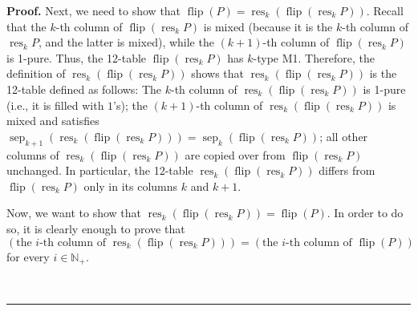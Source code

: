 \documentclass[numbers=enddot,12pt,final,onecolumn,notitlepage]{scrartcl}%
\theoremstyle{definition}
\newenvironment{proof}[1][Proof]{\noindent\textbf{#1.} }{\ \rule{0.5em}{0.5em}}
\newenvironment{verlong}{}{}
\begin{document}
\begin{verlong}
\begin{proof}
Next, we need to show that $\operatorname*{flip}\left(  P\right)
=\operatorname*{res}\nolimits_{k}\left(  \operatorname*{flip}\left(
\operatorname*{res}\nolimits_{k}P\right)  \right)  $. Recall that the $k$-th
column of $\operatorname*{flip}\left(  \operatorname*{res}\nolimits_{k}%
P\right)  $ is mixed (because it is the $k$-th column of $\operatorname*{res}%
\nolimits_{k}P$, and the latter is mixed), while the $\left(  k+1\right)  $-th
column of $\operatorname*{flip}\left(  \operatorname*{res}\nolimits_{k}%
P\right)  $ is 1-pure. Thus, the 12-table $\operatorname*{flip}\left(
\operatorname*{res}\nolimits_{k}P\right)  $ has $k$-type M1. Therefore, the
definition of $\operatorname*{res}\nolimits_{k}\left(  \operatorname*{flip}%
\left(  \operatorname*{res}\nolimits_{k}P\right)  \right)  $ shows that
$\operatorname*{res}\nolimits_{k}\left(  \operatorname*{flip}\left(
\operatorname*{res}\nolimits_{k}P\right)  \right)  $ is the 12-table defined
as follows: The $k$-th column of $\operatorname*{res}_{k}\left(
\operatorname*{flip}\left(  \operatorname*{res}\nolimits_{k}P\right)  \right)
$ is 1-pure (i.e., it is filled with $1$'s); the $\left(  k+1\right)  $-th
column of $\operatorname*{res}\nolimits_{k}\left(  \operatorname*{flip}\left(
\operatorname*{res}\nolimits_{k}P\right)  \right)  $ is mixed and satisfies
\newline$\operatorname*{sep}\nolimits_{k+1}\left(  \operatorname*{res}%
\nolimits_{k}\left(  \operatorname*{flip}\left(  \operatorname*{res}%
\nolimits_{k}P\right)  \right)  \right)  =\operatorname*{sep}\nolimits_{k}%
\left(  \operatorname*{flip}\left(  \operatorname*{res}\nolimits_{k}P\right)
\right)  $; all other columns of $\operatorname*{res}_{k}\left(
\operatorname*{flip}\left(  \operatorname*{res}\nolimits_{k}P\right)  \right)
$ are copied over from $\operatorname*{flip}\left(  \operatorname*{res}%
\nolimits_{k}P\right)  $ unchanged. In particular, the 12-table
$\operatorname*{res}\nolimits_{k}\left(  \operatorname*{flip}\left(
\operatorname*{res}\nolimits_{k}P\right)  \right)  $ differs from
$\operatorname*{flip}\left(  \operatorname*{res}\nolimits_{k}P\right)  $ only
in its columns $k$ and $k+1$.

Now, we want to show that $\operatorname*{res}\nolimits_{k}\left(
\operatorname*{flip}\left(  \operatorname*{res}\nolimits_{k}P\right)  \right)
=\operatorname*{flip}\left(  P\right)  $. In order to do so, it is clearly
enough to prove that%
\begin{equation}
\left(  \text{the }i\text{-th column of }\operatorname*{res}\nolimits_{k}%
\left(  \operatorname*{flip}\left(  \operatorname*{res}\nolimits_{k}P\right)
\right)  \right)  =\left(  \text{the }i\text{-th column of }%
\operatorname*{flip}\left(  P\right)  \right)
\label{pf.lem.BK.res.flip.pf.c3.icol}%
\end{equation}
for every $i\in\mathbb{N}_{+}$.


\end{proof}
\end{verlong}
\end{document}
